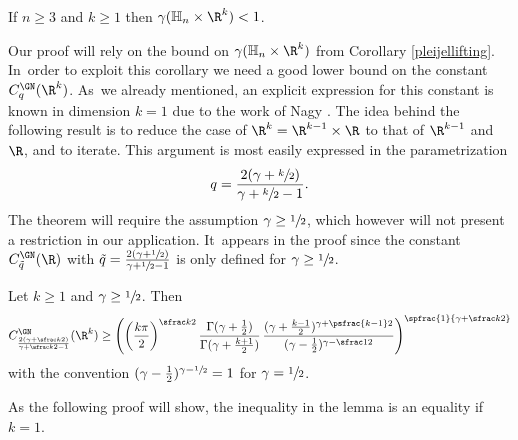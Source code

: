 \begin{proposition}\label{largedimension}
If $n\geq 3$ and $k\geq 1$ then $\gamma(\mathbb H_n\times\R^k)<1$.
\end{proposition}

Our proof will rely on the bound on $\gamma(\mathbb H_n\times\R^k)$ from Corollary \ref{pleijellifting}. In~order to exploit this corollary we need a good lower bound on the constant $C^\GN_q(\R^k)$. As~we already mentioned, an explicit expression for this constant is known in dimension $k=1$ due to the work of Nagy \cite{Na}. The idea behind the following result is to reduce the case of $\R^k=\R^{k-1}\times\R$ to that of $\R^{k-1}$ and $\R$, and to iterate. This argument is most easily expressed in the parametrization
\[
q=\frac{2(\gamma+\sfrac k2)}{\gamma+\sfrac k2 -1}.
\]
The theorem will require the assumption $\gamma\geq\sfrac12$, which however will not present a restriction in our application. It~appears in the proof since the constant $C_{\tilde q}^\GN(\R)$ with $\tilde q= \frac{2(\gamma+\sfrac 12)}{\gamma+\sfrac 12 -1}$ is only defined for $\gamma\geq\sfrac12$.

\begin{lemma}
Let $k\geq 1$ and $\gamma\geq\sfrac12$. Then
\[
C_{\frac{2(\gamma+\sfrac k2)}{\gamma+\sfrac k2-1}}^\GN(\R^k) \geq \left(\left(\frac{k\pi}{2}\right)^{\sfrac k2} \frac{\Gamma(\gamma+\frac12)}{\Gamma(\gamma+\frac{k+1}2)} \,\frac{(\gamma+\frac{k-1}{2})^{\gamma+\psfrac{k-1}2}}{(\gamma-\frac12)^{\gamma-\sfrac12}}\right)^{\spfrac{1}{\gamma+\sfrac k2}}
\]
with the convention $(\gamma-\frac12)^{\gamma-\sfrac12}=1$ for $\gamma=\sfrac12$.
\end{lemma}

As the following proof will show, the inequality in the lemma is an equality if $k=1$.

